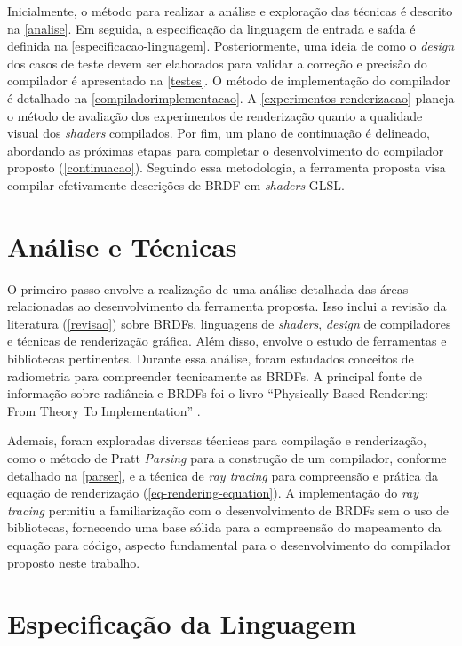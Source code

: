 \documentclass[english, 
               brazil, 
               bsc] %
               {dcomp-abntex2}
\begin{document}
Inicialmente, o método para realizar a análise e exploração das técnicas é descrito na \autoref{analise}. Em seguida, a especificação da linguagem de entrada e saída é definida na \autoref{especificacao-linguagem}. Posteriormente, uma ideia de como o \textit{design} dos casos de teste devem ser elaborados para validar a correção e precisão do compilador é apresentado na \autoref{testes}. O método de implementação do compilador é detalhado na \autoref{compiladorimplementacao}. A \autoref{experimentos-renderizacao} planeja o método de avaliação dos experimentos de renderização quanto a qualidade visual dos \textit{shaders} compilados. Por fim, um plano de continuação é delineado, abordando as próximas etapas para completar o desenvolvimento do compilador proposto (\autoref{continuacao}).
Seguindo essa metodologia, a ferramenta proposta visa compilar efetivamente descrições de BRDF em \textit{shaders} GLSL.


\section{Análise e Técnicas} \label{analise}




O primeiro passo envolve a realização de uma análise detalhada das áreas relacionadas ao desenvolvimento da ferramenta proposta. Isso inclui a revisão da literatura (\autoref{revisao}) sobre BRDFs, linguagens de \textit{shaders}, \textit{design} de compiladores e técnicas de renderização gráfica. Além disso, envolve o estudo de ferramentas e bibliotecas pertinentes. Durante essa análise, foram estudados conceitos de radiometria para compreender tecnicamente as BRDFs. A principal fonte de informação sobre radiância e BRDFs foi o livro ``Physically Based Rendering: From Theory To Implementation'' \cite{pbr}.


Ademais, foram exploradas diversas técnicas para compilação e renderização, como o método de Pratt \textit{Parsing} para a construção de um compilador, conforme detalhado na \autoref{parser}, e a técnica de \textit{ray tracing} para compreensão e prática da equação de renderização (\autoref{eq-rendering-equation}). A implementação do \textit{ray tracing} permitiu a familiarização com o desenvolvimento de BRDFs sem o uso de bibliotecas, fornecendo uma base sólida para a compreensão do mapeamento da equação para código, aspecto fundamental para o desenvolvimento do compilador proposto neste trabalho.


\section{Especificação da Linguagem}\label{especificacao-linguagem}
\end{document}
